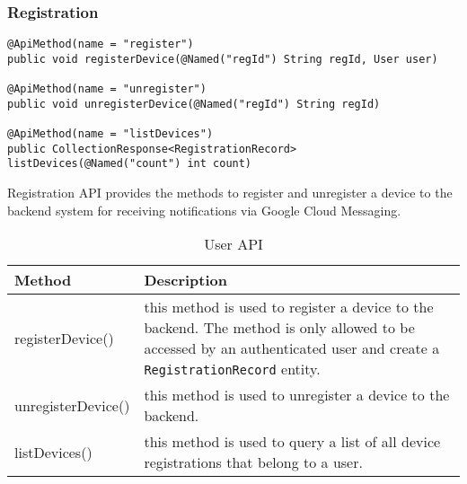 \subsubsection{Registration}
\begin{minipage}{\linewidth}
\begin{lstlisting}
@ApiMethod(name = "register")
public void registerDevice(@Named("regId") String regId, User user)

@ApiMethod(name = "unregister")
public void unregisterDevice(@Named("regId") String regId)

@ApiMethod(name = "listDevices")
public CollectionResponse<RegistrationRecord> listDevices(@Named("count") int count)
\end{lstlisting}
\end{minipage}

Registration API provides the methods to register and unregister a device to the backend system for receiving
notifications via Google Cloud Messaging.

\begin{table}
\begin{center}
    \begin{tabularx}{\textwidth}{| l | X |}
        \hline Method & Description \\
        \hline registerDevice() & 
            this method is used to register a device to the backend. The method is only allowed to be accessed by an
            authenticated user and create a \texttt{RegistrationRecord} entity. \\
        \hline unregisterDevice() &
            this method is used to unregister a device to the backend.\\
        \hline listDevices() &
            this method is used to query a list of all device registrations that belong to a user. \\
        \hline
    \end{tabularx}
\end{center}
\caption{User API}
\end{table}

